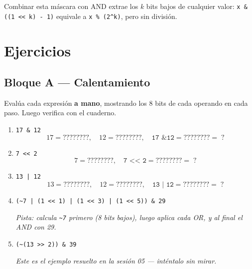 \documentclass[12pt, oneside]{article}
\begin{document}
\begin{consejo}
  Combinar esta máscara con AND extrae los $k$ bits bajos de cualquier valor:
  \texttt{x \& ((1 << k) - 1)} equivale a \texttt{x \% (2\^{}k)},
  pero sin división.
\end{consejo}

\section{Ejercicios}

\subsection{Bloque A — Calentamiento}

Evalúa cada expresión \textbf{a mano}, mostrando los 8 bits de cada operando
en cada paso. Luego verifica con el cuaderno.

\begin{enumerate}

  \item \texttt{17 \& 12}
        \[
          17 = \texttt{????????}, \quad
          12 = \texttt{????????}, \quad
          \texttt{17 \& 12} = \texttt{????????} = \;?
        \]

  \item \texttt{7 << 2}
        \[
          7 = \texttt{????????}, \quad
          \texttt{7 << 2} = \texttt{????????} = \;?
        \]

  \item \texttt{13 | 12}
        \[
          13 = \texttt{????????}, \quad
          12 = \texttt{????????}, \quad
          \texttt{13 | 12} = \texttt{????????} = \;?
        \]

  \item \texttt{(\textasciitilde 7 | (1 << 1) | (1 << 3) | (1 << 5)) \& 29}

        \textit{Pista: calcula \texttt{\textasciitilde 7} primero (8 bits bajos),
        luego aplica cada OR, y al final el AND con 29.}

  \item \texttt{(\textasciitilde(13 >> 2)) \& 39}

        \textit{Este es el ejemplo resuelto en la sesión 05 — inténtalo sin mirar.}

\end{enumerate}
\end{document}
